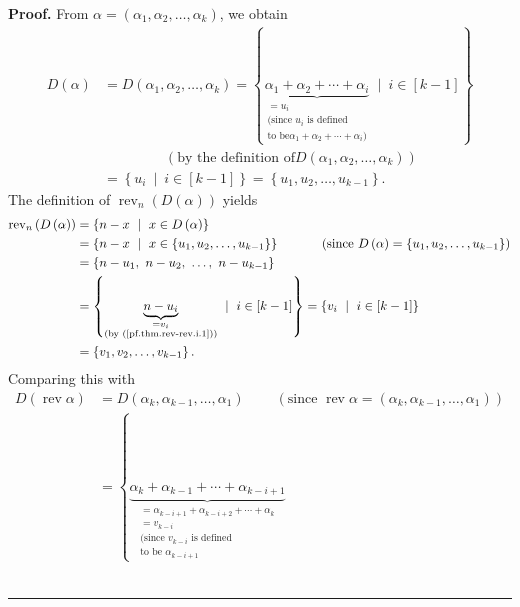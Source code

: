 \documentclass[numbers=enddot,12pt,final,onecolumn,notitlepage]{scrartcl}%
\theoremstyle{definition}
\newenvironment{proof}[1][Proof]{\noindent\textbf{#1.} }{\ \rule{0.5em}{0.5em}}
\begin{document}
\begin{proof}
From $\alpha=\left(  \alpha_{1},\alpha_{2},\ldots,\alpha_{k}\right)  $, we
obtain
\begin{align*}
D\left(  \alpha\right)   &  =D\left(  \alpha_{1},\alpha_{2},\ldots,\alpha
_{k}\right)  =\left\{  \underbrace{\alpha_{1}+\alpha_{2}+\cdots+\alpha_{i}%
}_{\substack{=u_{i}\\\text{(since }u_{i}\text{ is defined}\\\text{to be
}\alpha_{1}+\alpha_{2}+\cdots+\alpha_{i}\text{)}}}\ \mid\ i\in\left[
k-1\right]  \right\} \\
&  \ \ \ \ \ \ \ \ \ \ \ \ \ \ \ \ \ \ \ \ \left(  \text{by the definition of
}D\left(  \alpha_{1},\alpha_{2},\ldots,\alpha_{k}\right)  \right) \\
&  =\left\{  u_{i}\ \mid\ i\in\left[  k-1\right]  \right\}  =\left\{
u_{1},u_{2},\ldots,u_{k-1}\right\}  .
\end{align*}
The definition of $\operatorname*{rev}\nolimits_{n}\left(  D\left(
\alpha\right)  \right)  $ yields%
\begin{align*}
\operatorname*{rev}\nolimits_{n}\left(  D\left(  \alpha\right)  \right)   &
=\left\{  n-x\ \mid\ x\in D\left(  \alpha\right)  \right\} \\
&  =\left\{  n-x\ \mid\ x\in\left\{  u_{1},u_{2},\ldots,u_{k-1}\right\}
\right\}  \ \ \ \ \ \ \ \ \ \ \left(  \text{since }D\left(  \alpha\right)
=\left\{  u_{1},u_{2},\ldots,u_{k-1}\right\}  \right) \\
&  =\left\{  n-u_{1},\ n-u_{2},\ \ldots,\ n-u_{k-1}\right\} \\
&  =\left\{  \underbrace{n-u_{i}}_{\substack{=v_{i}\\\text{(by
(\ref{pf.thm.rev-rev.i.1}))}}}\ \mid\ i\in\left[  k-1\right]  \right\}
=\left\{  v_{i}\ \mid\ i\in\left[  k-1\right]  \right\} \\
&  =\left\{  v_{1},v_{2},\ldots,v_{k-1}\right\}  .
\end{align*}
Comparing this with%
\begin{align*}
D\left(  \operatorname*{rev}\alpha\right)   &  =D\left(  \alpha_{k}%
,\alpha_{k-1},\ldots,\alpha_{1}\right)  \ \ \ \ \ \ \ \ \ \ \left(
\text{since }\operatorname*{rev}\alpha=\left(  \alpha_{k},\alpha_{k-1}%
,\ldots,\alpha_{1}\right)  \right) \\
&  =\left\{  \underbrace{\alpha_{k}+\alpha_{k-1}+\cdots+\alpha_{k-i+1}%
}_{\substack{=\alpha_{k-i+1}+\alpha_{k-i+2}+\cdots+\alpha_{k}\\=v_{k-i}%
\\\text{(since }v_{k-i}\text{ is defined}\\\text{to be }\alpha_{k-i+1}%
}}
\end{align*}
\end{proof}
\end{document}
